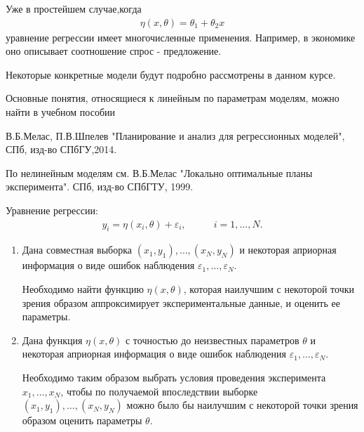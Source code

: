 \documentclass[10pt,slidestop,usepdftitle=false]{beamer}
\begin{document}
\begin{frame}
Уже в простейшем случае,когда
 \begin{align*}
\eta(x,\theta)=\theta_1 +\theta_2 x
 \end{align*}
уравнение регрессии имеет многочисленные применения. Например, в экономике оно описывает соотношение спрос - предложение.
\pause
\bigskip 

Некоторые конкретные модели будут подробно рассмотрены в данном курсе. 
\pause
\bigskip

Основные понятия, относящиеся к линейным по параметрам моделям, можно найти в учебном пособии 

\bigskip

В.Б.Мелас, П.В.Шпелев "Планирование и анализ для регрессионных моделей", СПб, изд-во СПбГУ,2014.
\pause
\bigskip

По нелинейным моделям см. В.Б.Мелас "Локально оптимальные планы эксперимента". СПб, изд-во СПбГТУ, 1999.
\end{frame}

\begin{frame}
Уравнение регрессии:
 \begin{align*}
	y_{i} = \eta(x_i,\theta)+\varepsilon_{i}, \qquad &i = 1, \dots, N.
 \end{align*}
 \begin{enumerate}
 \item<3-> Дана совместная выборка $(x_1, y_1), \dots, (x_N, y_N)$ и некоторая априорная информация о виде ошибок наблюдения $\varepsilon_1, \dots,\varepsilon_N$. 
 
 \vspace{2mm}
 
 Необходимо найти функцию $\eta(x,\theta)$, которая наилучшим с некоторой точки зрения образом аппроксимирует экспериментальные данные, и оценить ее параметры.

 \vspace{2mm} 
 
 \item<4-> Дана функция $\eta(x,\theta)$ с точностью до неизвестных параметров $\theta$ и некоторая априорная информация о виде ошибок наблюдения $\varepsilon_1, \dots,\varepsilon_N$. 
  
  \vspace{2mm}
 
 Необходимо таким образом выбрать условия проведения эксперимента $x_1,\dots,x_N$, чтобы по получаемой впоследствии выборке $(x_1, y_1), \dots, (x_N, y_N)$ можно было бы наилучшим с некоторой точки зрения образом оценить параметры  $\theta$.
 \end{enumerate}
\end{frame}
\end{document}
